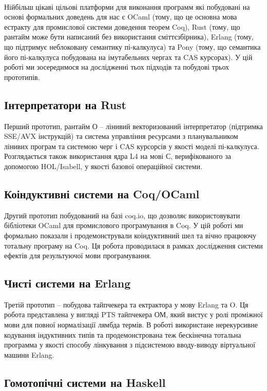 \paragraph{}
Нійбільш цікаві цільові платформи для виконання программ
які побудовані на основі формальних доведень для нас є OCaml (тому,
що це основна мова естракту для промислової системи доведення теорем Coq),
Rust (тому, що рантайм може бути написаний без використання сміттєзбірника),
Erlang (тому, що підтримує неблоковану семантику пі-калкулуса)
та Pony (тому, що семантика його пі-калкулуса побудована на імутабельних чергах та CAS курсорах).
У цій роботі ми зосередимося на дослідженні тьох підходів
та побудові трьох прототипів.

\subsection{Інтерпретатори на Rust}
Перший прототип, рантайм О -- лінивий
векторизований інтерпретатор (підтримка SSE/AVX інструкцій) та система
управління ресурсами з планувальником лінивих програм
та системою черг і CAS курсорсів у якості моделі пі-калкулуса. Розглядається також
використання ядра L4 на мові С, верифікованого за допомогою HOL/Isabell,
у якості базової операційної системи.

\subsection{Коіндуктивні системи на Coq/OCaml}
Другий прототип побудований на базі coq.io, що дозволяє
використовувати бібліотеки OCaml для промислового програмування в Coq.
У цій роботі ми формально показали і продемонстрували коіндуктивний шел
та вічно працюючу тотальну програму на Coq. Ця робота проводилася
в рамках дослідження системи ефектів для результуючої мови програмування.

\subsection{Чисті системи на Erlang}
Третій прототип -- побудова тайпчекера та ектрактора у мову Erlang та O.
Ця робота представлена у вигляді PTS тайпчекера ОМ, який вистує у ролі
проміжної мови для повної нормалізації лямбда термів. В роботі використане
нерекурсивне кодування індуктивних типів та продемонстрована теж бескінечна
тотальна программа у якості способу лінкування з підсистемою вводу-виводу
віртуальної машини Erlang.

\subsection{Гомотопічні системи на Haskell}